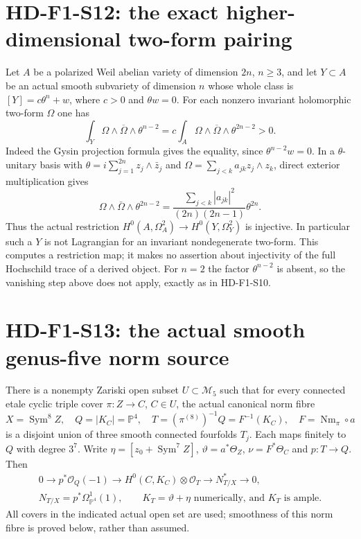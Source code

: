
\section{HD-F1-S12: the exact higher-dimensional two-form pairing}
\label{sec:f1-higher-lagrangian-obstruction}

Let $A$ be a polarized Weil abelian variety of dimension $2n$, $n\geq3$,
and let $Y\subset A$ be an actual smooth subvariety of dimension $n$
whose whole class is $[Y]=c\theta^n+w$, where $c>0$ and $\theta w=0$.
For each nonzero invariant holomorphic two-form $\Omega$ one has
\[
 \int_Y\Omega\wedge\overline\Omega\wedge\theta^{n-2}
 =c\int_A\Omega\wedge\overline\Omega\wedge\theta^{2n-2}>0.
 \tag{F1S12.1}
\]
Indeed the Gysin projection formula gives the equality, since
$\theta^{n-2}w=0$. In a $\theta$-unitary basis with
$\theta=i\sum_{j=1}^{2n}z_j\wedge\bar z_j$ and
$\Omega=\sum_{j<k}a_{jk}z_j\wedge z_k$, direct exterior multiplication gives
\[
 \Omega\wedge\bar\Omega\wedge\theta^{2n-2}
   =\frac{\sum_{j<k}|a_{jk}|^2}{(2n)(2n-1)}\theta^{2n}.
 \tag{F1S12.2}
\]
Thus the actual restriction $H^0(A,\Omega_A^2)\to H^0(Y,\Omega_Y^2)$
is injective. In particular such a $Y$ is not Lagrangian for an invariant
nondegenerate two-form. This computes a restriction map; it makes no
assertion about injectivity of the full Hochschild trace of a derived
object. For $n=2$ the factor $\theta^{n-2}$ is absent, so the vanishing
step above does not apply, exactly as in HD-F1-S10.

\section{HD-F1-S13: the actual smooth genus-five norm source}
\label{sec:f1-norm-fourfold-source}

There is a nonempty Zariski open subset $U\subset\mathcal M_5$ such that
for every connected etale cyclic triple cover $\pi:Z\to C$, $C\in U$,
the actual canonical norm fibre
\[
 X=\operatorname{Sym}^8Z,\quad Q=|K_C|=\mathbb P^4,\quad
 T=(\pi^{(8)})^{-1}Q=F^{-1}(K_C),\quad F=\operatorname{Nm}_\pi\circ a
 \tag{F1S13.1}
\]
is a disjoint union of three smooth connected fourfolds $T_j$. Each
maps finitely to $Q$ with degree $3^7$. Write
$\eta=[z_0+\operatorname{Sym}^7Z]$, $\vartheta=a^*\Theta_Z$,
$\nu=F^*\Theta_C$ and $p:T\to Q$. Then
\[
 \begin{gathered}
 0\longrightarrow p^*\mathcal O_Q(-1)\longrightarrow
 H^0(C,K_C)\otimes\mathcal O_T\longrightarrow N^*_{T/X}\longrightarrow0,\\
 N_{T/X}=p^*\Omega^1_{\mathbb P^4}(1),\qquad
 K_T=\vartheta+\eta\text{ numerically, and }K_T\text{ is ample}.
 \end{gathered}
 \tag{F1S13.2}
\]
All covers in the indicated actual open set are used; smoothness of
this norm fibre is proved below, rather than assumed.

